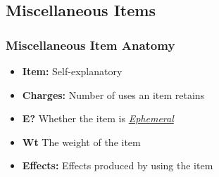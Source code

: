 \documentclass[12pt]{article}
\newcommand{\reftoit}[1]{\hyperlink{#1}{\emph{#1}}}
\begin{document}
\pagebreak

\subsection{Miscellaneous Items}
\subsubsection*{Miscellaneous Item Anatomy}
\begin{itemize}
\item \textbf{Item:} Self-explanatory
\item \textbf{Charges:} Number of uses an item retains
\item \textbf{E?} Whether the item is \reftoit{Ephemeral}
\item \textbf{Wt} The weight of the item
\item \textbf{Effects:} Effects produced by using the item
\end{itemize}
\end{document}
